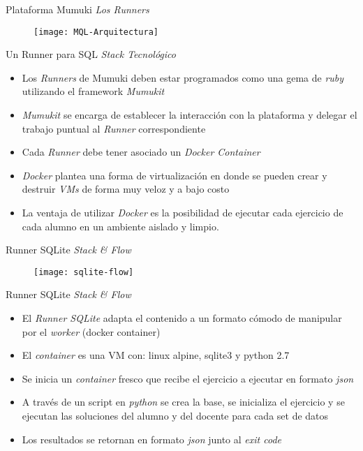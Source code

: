 \documentclass{beamer}
\begin{document}
\begin{frame}
    {Plataforma Mumuki}
    {\emph{Los Runners}}

    \vspace{-.9em}
    \begin{figure}[h]
        \texttt{[image: MQL-Arquitectura]}
    \end{figure}
\end{frame}


\begin{frame}
    {Un Runner para SQL}
    {\emph{Stack Tecnológico}}

    \begin{itemize}
        \item Los \emph{Runners} de Mumuki deben estar programados
        como una gema de \emph{ruby} utilizando el framework \emph{Mumukit}
        \item \emph{Mumukit} se encarga de establecer la interacción con
        la plataforma y delegar el trabajo puntual al \emph{Runner} correspondiente
        \item Cada \emph{Runner} debe tener asociado un \emph{Docker Container}
        \item \emph{Docker} plantea una forma de virtualización en donde
        se pueden crear y destruir \emph{VMs} de forma muy veloz y a bajo costo
        \item La ventaja de utilizar \emph{Docker} es la posibilidad
        de ejecutar cada ejercicio de cada alumno en un ambiente
        aislado y limpio.
    \end{itemize}
\end{frame}

\begin{frame}
    {Runner SQLite}
    {\emph{Stack \& Flow}}

    \begin{figure}[h]
        \texttt{[image: sqlite-flow]}
    \end{figure}
\end{frame}

\begin{frame}
    {Runner SQLite}
    {\emph{Stack \& Flow}}

    \begin{itemize}
        \item El \emph{Runner SQLite} adapta el contenido a un formato
        cómodo de manipular por el \emph{worker} (docker container)
        \item El \emph{container} es una VM con: {\footnotesize linux alpine, sqlite3 y python 2.7}
        \item Se inicia un \emph{container} fresco que recibe el ejercicio
        a ejecutar en formato \emph{json}
        \item A través de un script en \emph{python} se crea la base, se inicializa
        el ejercicio y se ejecutan las soluciones del alumno y del docente
        para cada set de datos
        \item Los resultados se retornan en formato \emph{json} junto al
        \emph{exit code}
    \end{itemize}

\end{frame}
\end{document}
